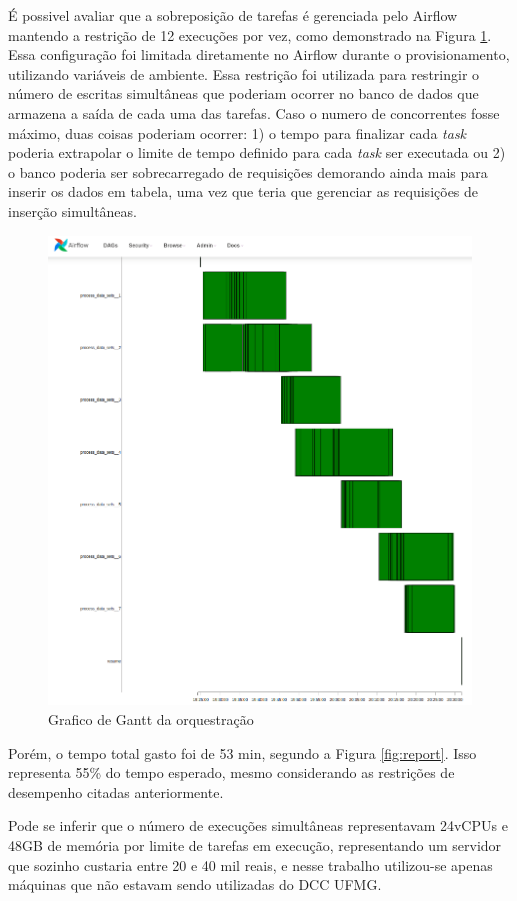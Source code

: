 É possivel avaliar que a sobreposição de tarefas é gerenciada pelo Airflow mantendo a restrição de 12 execuções por vez, como demonstrado na Figura \ref{fig:gantt}. Essa configuração foi limitada diretamente no Airflow durante o provisionamento, utilizando variáveis de ambiente. Essa restrição foi utilizada para restringir o número de escritas simultâneas que poderiam ocorrer no banco de dados que armazena a saída de cada uma das tarefas. Caso o numero de concorrentes fosse máximo, duas coisas poderiam ocorrer: 1) o tempo para finalizar cada \emph{task} poderia extrapolar o limite de tempo definido para cada \emph{task} ser executada ou 2) o banco poderia ser sobrecarregado de requisições demorando ainda mais para inserir os dados em tabela, uma vez que teria que gerenciar as requisições de inserção simultâneas. 

\begin{figure}[!ht]
    \centering
    \includegraphics[width=0.7\linewidth]{04-figuras/gantt.png}
    \caption{Grafico de Gantt da orquestração}
    \label{fig:gantt}
\end{figure}

Porém, o tempo total gasto foi de 53 min, segundo a Figura \ref{fig:report}. Isso representa 55\% do tempo esperado, mesmo considerando as restrições de desempenho citadas anteriormente.

Pode se inferir que o número de execuções simultâneas representavam 24vCPUs e 48GB de memória por limite de tarefas em execução, representando um servidor que sozinho custaria entre 20 e 40 mil reais, e nesse trabalho utilizou-se apenas máquinas que não estavam sendo utilizadas do DCC UFMG.

